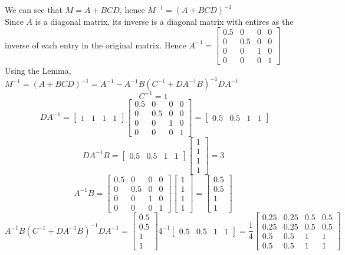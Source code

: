 \documentclass[letterpaper]{article}
\begin{document}
We can see that $M= A + BCD$, hence $M^{-1}= (A + BCD)^{-1}$\\

Since $A$ is a diagonal matrix, its inverse is a diagonal matrix with entires as the inverse of each entry in the original matrix. Hence $A^{-1}=\begin{bmatrix} 0.5 &0 & 0 & 0\\ 0 &  0.5& 0 & 0\\ 0 & 0 & 1 & 0\\ 0 & 0 & 0 & 1
\end{bmatrix}$\\

Using the Lemma, $M^{-1}=(A + BCD)^{-1}=A^{-1}-A^{-1}B(C^{-1}+DA^{-1}B)^{-1}DA^{-1}$
$$C^{-1}=1$$
$$~~ DA^{-1} = \begin{bmatrix} 1 &1 & 1 & 1\end{bmatrix}\begin{bmatrix} 0.5 &0 & 0 & 0\\ 0 &  0.5& 0 & 0\\ 0 & 0 & 1 & 0\\ 0 & 0 & 0 & 1
\end{bmatrix} =  \begin{bmatrix} 0.5 &0.5 & 1 & 1\end{bmatrix}$$
$$ DA^{-1}B =  \begin{bmatrix} 0.5 &0.5 & 1 & 1\end{bmatrix}\begin{bmatrix} 1 \\1 \\ 1 \\ 1\end{bmatrix} = 3$$
$$A^{-1}B= \begin{bmatrix} 0.5 &0 & 0 & 0\\ 0 &  0.5& 0 & 0\\ 0 & 0 & 1 & 0\\ 0 & 0 & 0 & 1
\end{bmatrix} \begin{bmatrix} 1 \\1 \\ 1 \\ 1\end{bmatrix}=\begin{bmatrix} 0.5 \\0.5 \\ 1 \\ 1\end{bmatrix} $$
$$A^{-1}B(C^{-1}+DA^{-1}B)^{-1}DA^{-1}=  \begin{bmatrix} 0.5 \\0.5 \\ 1 \\ 1\end{bmatrix} 4^{-1}  \begin{bmatrix} 0.5 &0.5 & 1 & 1\end{bmatrix} = \frac{1}{4} \begin{bmatrix} 0.25 &0.25 & 0.5 & 0.5\\ 0.25 &0.25 & 0.5 & 0.5\\ 0.5 & 0.5 & 1 & 1\\ 0.5 & 0.5 & 1 & 1
\end{bmatrix} $$
\end{document}
